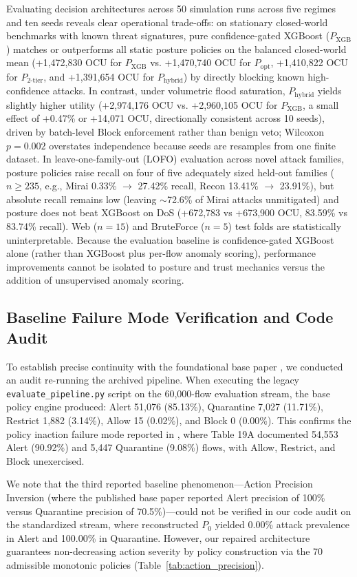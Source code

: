 \documentclass[journal,10pt,onecolumn]{IEEEtran}
\begin{document}
Evaluating decision architectures across 50 simulation runs across five regimes and ten seeds reveals clear operational trade-offs: on stationary closed-world benchmarks with known threat signatures, pure confidence-gated XGBoost ($P_{\text{XGB}}$) matches or outperforms all static posture policies on the balanced closed-world mean (+1,472,830 OCU for $P_{\text{XGB}}$ vs. +1,470,740 OCU for $P_{\text{opt}}$, +1,410,822 OCU for $P_{2\text{-tier}}$, and +1,391,654 OCU for $P_{\text{hybrid}}$) by directly blocking known high-confidence attacks. In contrast, under volumetric flood saturation, $P_{\text{hybrid}}$ yields slightly higher utility (+2,974,176 OCU vs. +2,960,105 OCU for $P_{\text{XGB}}$, a small effect of +0.47\% or +14,071 OCU, directionally consistent across 10 seeds), driven by batch-level Block enforcement rather than benign veto; Wilcoxon $p = 0.002$ overstates independence because seeds are resamples from one finite dataset. In leave-one-family-out (LOFO) evaluation across novel attack families, posture policies raise recall on four of five adequately sized held-out families ($n \ge 235$, e.g., Mirai 0.33\% $\to$ 27.42\% recall, Recon 13.41\% $\to$ 23.91\%), but absolute recall remains low (leaving $\sim$72.6\% of Mirai attacks unmitigated) and posture does not beat XGBoost on DoS (+672,783 vs +673,900 OCU, 83.59\% vs 83.74\% recall). Web ($n=15$) and BruteForce ($n=5$) test folds are statistically uninterpretable. Because the evaluation baseline is confidence-gated XGBoost alone (rather than XGBoost plus per-flow anomaly scoring), performance improvements cannot be isolated to posture and trust mechanics versus the addition of unsupervised anomaly scoring.

\subsection{Baseline Failure Mode Verification and Code Audit}
To establish precise continuity with the foundational base paper \cite{1}, we conducted an audit re-running the archived pipeline. When executing the legacy \texttt{evaluate\_pipeline.py} script on the 60,000-flow evaluation stream, the base policy engine produced: Alert 51,076 (85.13\%), Quarantine 7,027 (11.71\%), Restrict 1,882 (3.14\%), Allow 15 (0.02\%), and Block 0 (0.00\%). This confirms the policy inaction failure mode reported in \cite{1}, where Table 19A documented 54,553 Alert (90.92\%) and 5,447 Quarantine (9.08\%) flows, with Allow, Restrict, and Block unexercised.

We note that the third reported baseline phenomenon---Action Precision Inversion (where the published base paper reported Alert precision of 100\% versus Quarantine precision of 70.5\%)---could not be verified in our code audit on the standardized stream, where reconstructed $P_0$ yielded 0.00\% attack prevalence in Alert and 100.00\% in Quarantine. However, our repaired architecture guarantees non-decreasing action severity by policy construction via the 70 admissible monotonic policies (Table~\ref{tab:action_precision}).
\end{document}

